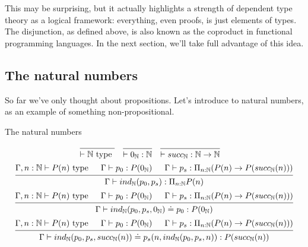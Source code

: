 \documentclass[a4paper, 12pt]{article}
\newcommand{\N}{\mathbb{N}}
\theoremstyle{changedot}
\theoremstyle{changedotbreak}
\theoremstyle{nonumberplain}
\begin{document}
This may be surprising, but it actually highlights a strength of dependent type theory as a logical framework: everything, even proofs, is just elements of types. The disjunction, as defined above, is also known as the coproduct in functional programming languages. In the next section, we'll take full advantage of this idea.

\subsection{The natural numbers}
So far we've only thought about propositions. Let's introduce to natural numbers, as an example of something non-propositional.

\begin{definition}
  The natural numbers

\begin{align*}
 &\begin{prooftree}
    \infer0{\vdash \N \text{ type }}
  \end{prooftree}
   &
  &\begin{prooftree}
    \infer0{\vdash 0_{\N} : \N}
    \end{prooftree}
    &
    &\begin{prooftree}
      \infer0{\vdash succ_{\N} : \N \to \N}
    \end{prooftree}
\end{align*}
\begin{align*}
  \begin{prooftree}
    \hypo{\Gamma, n : \N \vdash P(n) \text{ type}}
    \hypo{\Gamma \vdash p_{0} : P(0_{\N})}
    \hypo{\Gamma \vdash p_{s} : \Pi_{n:\N} (P(n) \to P(succ_{\N}(n)))}
    \infer3{\Gamma \vdash ind_{\N}(p_{0}, p_{s}) : \Pi_{n:\N} P(n)}
  \end{prooftree}
\end{align*}
\begin{align*}
  \begin{prooftree}
      \hypo{\Gamma, n : \N \vdash P(n) \text{ type}}
      \hypo{\Gamma \vdash p_{0} : P(0_{\N})}
      \hypo{\Gamma \vdash p_{s} : \Pi_{n:\N} (P(n) \to P(succ_{\N}(n)))}
      \infer3{\Gamma \vdash ind_{\N}(p_{0}, p_{s}, 0_{\N}) \doteq p_{0} : P(0_{\N})}
  \end{prooftree}
\end{align*}
\begin{align*}
  \begin{prooftree}
      \hypo{\Gamma, n : \N \vdash P(n) \text{ type}}
      \hypo{\Gamma \vdash p_{0} : P(0_{\N})}
      \hypo{\Gamma \vdash p_{s} : \Pi_{n:\N} (P(n) \to P(succ_{\N}(n)))}
      \infer3{\Gamma \vdash ind_{\N}(p_{0}, p_{s}, succ_{\N}(n)) \doteq p_{s}(n, ind_{\N}(p_{0}, p_{s}, n)) : P(succ_{\N}(n))}
  \end{prooftree}
\end{align*}
\end{definition}
\end{document}
